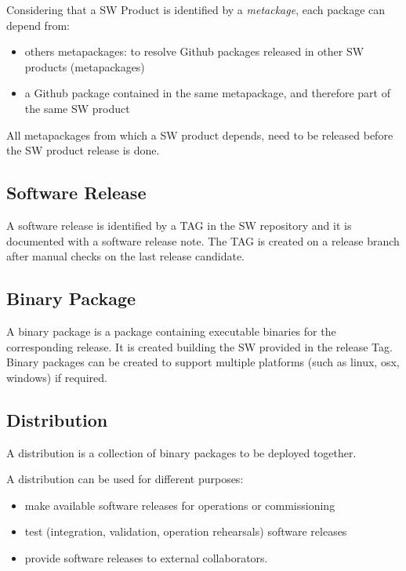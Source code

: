 Considering that a SW Product is identified by a \textit{metackage}, each package can depend from:

\begin{itemize}
\item others metapackages: to resolve Github packages released in other SW products (metapackages)
\item a Github package contained in the same metapackage, and therefore part of the same SW product
\end{itemize}

All metapackages from which a SW product depends, need to be released before the SW product release is done.


\subsection{Software Release} \label{sect:swrel}

A software release is identified by a TAG in the SW repository and it is documented with a software release note.
The TAG is created on a release branch after manual checks on the last release candidate.


\subsection{Binary Package} \label{sect:swbpkg}

A binary package is a package containing executable binaries for the corresponding release.
It is created building the SW provided in the release Tag. 
Binary packages can be created to support multiple platforms (such as linux, osx, windows) if required.


\subsection{Distribution} \label{sect:distribution}

A distribution is a collection of binary packages to be deployed together.

A distribution can be used for different purposes:

\begin{itemize}
\item make available software releases for operations or commissioning
\item test (integration, validation, operation rehearsals) software releases
\item provide software releases to external collaborators.
\end{itemize}


